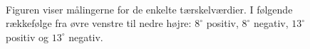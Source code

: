 \begin{figure}[h]
\\[0.3cm]%
%
\caption{Figuren viser målingerne for de enkelte tærskelværdier. I følgende rækkefølge fra øvre venstre til nedre højre: $8^{\circ}$ positiv, $8^{\circ}$ negativ, $13^{\circ}$ positiv og $13^{\circ}$ negativ.}
\label{fig:software_grafer}
\end{figure}
